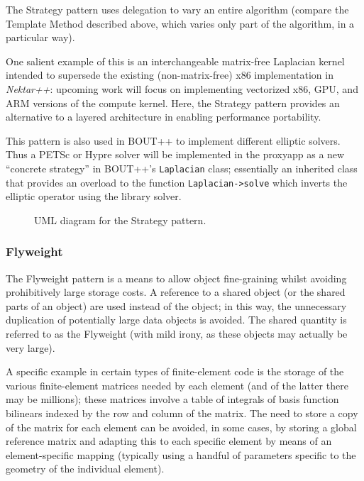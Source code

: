 The Strategy pattern uses delegation to vary an entire algorithm (compare the Template Method described above, which varies only part of the algorithm, in a particular way).

One salient example of this is an interchangeable matrix-free Laplacian kernel intended to supersede the existing (non-matrix-free) x86 implementation in {\it Nektar++}: upcoming work will focus on implementing vectorized x86, GPU, and ARM versions of the compute kernel.  
Here, the Strategy pattern provides an alternative to a layered architecture in enabling performance portability.

This pattern is also used in BOUT++ to implement different elliptic solvers.
Thus a PETSc or Hypre solver will be implemented in the proxyapp as a new
``concrete strategy'' in BOUT++'s \texttt{Laplacian} class; essentially an
inherited class that provides an overload to the function
\texttt{Laplacian->solve} which inverts the elliptic operator using the library
solver.


\begin{figure}
\centerline{}
\caption{\label{fig:strategyuml}
UML diagram for the Strategy pattern.}
\end{figure}

\subsubsection{Flyweight}

The Flyweight pattern is a means to allow object fine-graining whilst avoiding prohibitively large storage costs.  
A reference to a shared object (or the shared parts of an object) are used instead of the object; in this way, the unnecessary duplication of potentially large data objects is avoided.  
The shared quantity is referred to as the Flyweight (with mild irony, as these objects may actually be very large).

A specific example in certain types of finite-element code is the storage of the various finite-element matrices needed by each element (and of the latter there may be millions); these matrices involve a table of integrals of basis function bilinears indexed by the row and column of the matrix.  
The need to store a copy of the matrix for each element can be avoided, in some cases, by storing a global reference matrix and adapting this to each specific element by means of an element-specific mapping (typically using a handful of parameters specific to the geometry of the individual element).

